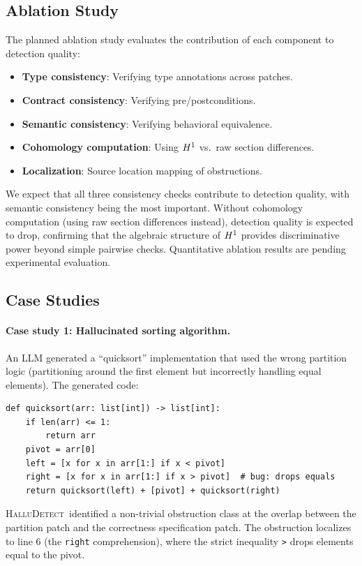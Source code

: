 \documentclass[11pt]{article}
\newcommand{\HalluDetect}{\textsc{HalluDetect}}
\begin{document}
\subsection{Ablation Study}

The planned ablation study evaluates the contribution of each
component to detection quality:
\begin{itemize}[noitemsep]
  \item \textbf{Type consistency}: Verifying type annotations across patches.
  \item \textbf{Contract consistency}: Verifying pre/postconditions.
  \item \textbf{Semantic consistency}: Verifying behavioral equivalence.
  \item \textbf{Cohomology computation}: Using $H^{1}$ vs.\ raw
        section differences.
  \item \textbf{Localization}: Source location mapping of obstructions.
\end{itemize}
We expect that all three consistency checks contribute to detection
quality, with semantic consistency being the most important.
Without cohomology computation (using raw section differences instead),
detection quality is expected to drop, confirming that the algebraic
structure of $H^{1}$ provides discriminative power beyond simple
pairwise checks.  Quantitative ablation results are pending
experimental evaluation.

\subsection{Case Studies}

\paragraph{Case study 1: Hallucinated sorting algorithm.}
An LLM generated a ``quicksort'' implementation that used the
wrong partition logic (partitioning around the first element
but incorrectly handling equal elements).  The generated code:
\begin{lstlisting}
def quicksort(arr: list[int]) -> list[int]:
    if len(arr) <= 1:
        return arr
    pivot = arr[0]
    left = [x for x in arr[1:] if x < pivot]
    right = [x for x in arr[1:] if x > pivot]  # bug: drops equals
    return quicksort(left) + [pivot] + quicksort(right)
\end{lstlisting}
\HalluDetect\ identified a non-trivial obstruction class at the
overlap between the partition patch and the correctness specification
patch.  The obstruction localizes to line 6 (the \texttt{right}
comprehension), where the strict inequality \texttt{>} drops elements
equal to the pivot.
\end{document}
